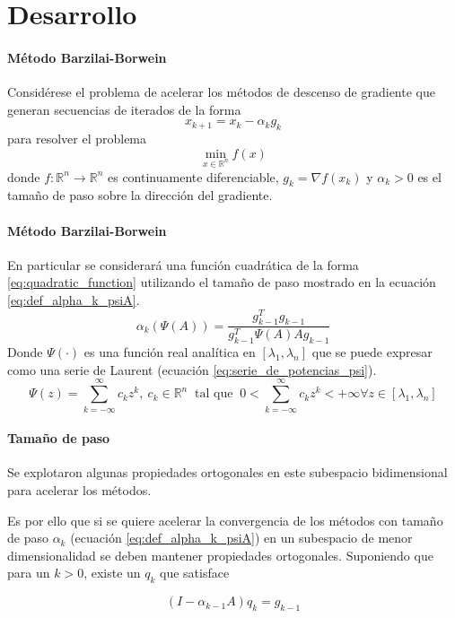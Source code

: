 \section{Desarrollo}

\begin{frame}{\insertsectionhead}
    \framesubtitle{Método Barzilai-Borwein}
    Considérese el problema de acelerar los métodos de descenso de gradiente que generan secuencias de iterados de la forma
    \begin{equation*}
        x_{k+1} = x_k - \alpha_k g_k
    \end{equation*}
    para resolver el problema
    \begin{equation*}
        \min_{x\in\mathbb{R}^n}f(x)
    \end{equation*}
    donde $f:\mathbb{R}^n \rightarrow \mathbb{R}^n$ es continuamente diferenciable, $g_k=\nabla f(x_k)$ y $\alpha_k>0$ es el tamaño de paso sobre la dirección del gradiente.
\end{frame}

\begin{frame}{\insertsectionhead}
    \framesubtitle{Método Barzilai-Borwein}
    En particular se considerará una función cuadrática de la forma \ref{eq:quadratic_function} utilizando el tamaño de paso mostrado en la ecuación \ref{eq:def_alpha_k_psiA}.
    \begin{equation}
        \alpha_k(\Psi(A)) = \frac{g_{k-1}^Tg_{k-1}}{g^T_{k-1}\Psi(A)Ag_{k-1}} \label{eq:def_alpha_k_psiA}
    \end{equation}
    Donde $\Psi(\cdot)$ es una función real analítica en $[\lambda_1, \lambda_n]$ que se puede expresar como una serie de Laurent (ecuación \ref{eq:serie_de_potencias_psi}).
    \begin{equation}
        \Psi(z) = \sum\limits_{k=-\infty}^{\infty} c_kz^k,\ c_k\in \mathbb{R}^n  \;\; \text{tal que} \;\; 0<\sum_{k =- \infty}^{\infty}c_k z^k<+\infty \forall z\in[\lambda_1,  \lambda_n]  \label{eq:serie_de_potencias_psi}
    \end{equation}
\end{frame}

\begin{frame}{\insertsectionhead}
    \framesubtitle{Tamaño de paso}
    Se explotaron algunas propiedades ortogonales en este subespacio bidimensional para acelerar los métodos.

    Es por ello que si se quiere acelerar la convergencia de los métodos con tamaño de paso $\alpha_k$ (ecuación \ref{eq:def_alpha_k_psiA}) en un subespacio de menor dimensionalidad se deben mantener propiedades ortogonales. Suponiendo que para un $k>0$, existe un $q_k$ que satisface

    \begin{equation*}
        (I-\alpha_{k-1}A)q_k = g_{k-1}
        \label{eq:qdef}
    \end{equation*}
\end{frame}

